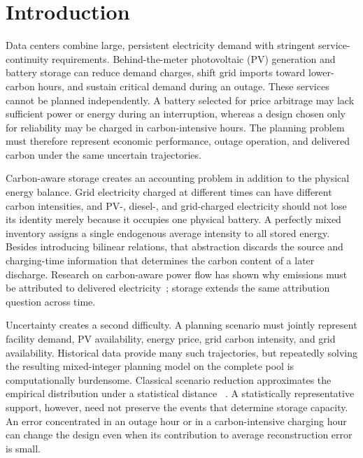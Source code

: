 \documentclass[times]{elsarticle}
\begin{document}
\section{Introduction}
\label{sec:introduction}

Data centers combine large, persistent electricity demand with stringent
service-continuity requirements. Behind-the-meter photovoltaic (PV) generation
and battery storage can reduce demand charges, shift grid imports toward
lower-carbon hours, and sustain critical demand during an outage. These services
cannot be planned independently. A battery selected for price arbitrage may
lack sufficient power or energy during an interruption, whereas a design chosen
only for reliability may be charged in carbon-intensive hours. The planning
problem must therefore represent economic performance, outage operation, and
delivered carbon under the same uncertain trajectories.

Carbon-aware storage creates an accounting problem in addition to the physical
energy balance. Grid electricity charged at different times can have different
carbon intensities, and PV-, diesel-, and grid-charged electricity should not
lose its identity merely because it occupies one physical battery. A perfectly
mixed inventory assigns a single endogenous average intensity to all stored
energy. Besides introducing bilinear relations, that abstraction discards the
source and charging-time information that determines the carbon content of a
later discharge. Research on carbon-aware power flow has shown why emissions
must be attributed to delivered electricity~\cite{chen2025copf}; storage extends
the same attribution question across time.

Uncertainty creates a second difficulty. A planning scenario must jointly
represent facility demand, PV availability, energy price, grid carbon
intensity, and grid availability. Historical data provide many such
trajectories, but repeatedly solving the resulting mixed-integer planning model
on the complete pool is computationally burdensome. Classical scenario
reduction approximates the empirical distribution under a statistical distance
~\cite{Dupacova2003}. A statistically representative support, however, need not
preserve the events that determine storage capacity. An error concentrated in
an outage hour or in a carbon-intensive charging hour can change the design even
when its contribution to average reconstruction error is small.
\end{document}
